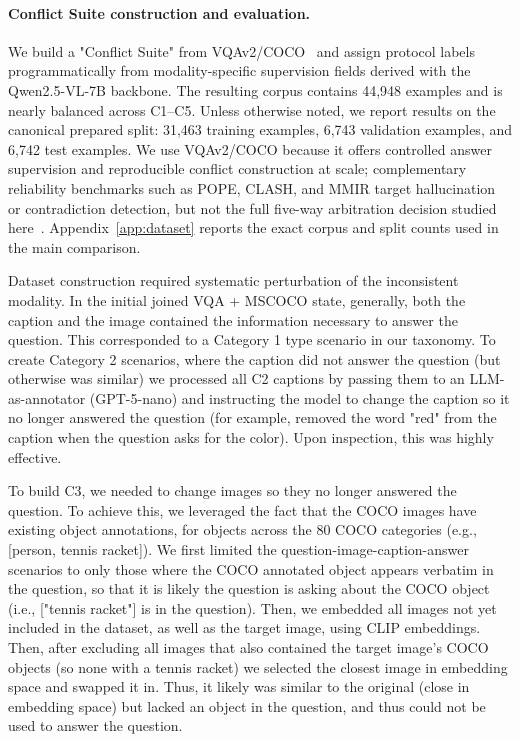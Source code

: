 \documentclass[11pt]{article}
\begin{document}


\paragraph{Conflict Suite construction and evaluation.}
We build a "Conflict Suite" from VQAv2/COCO~\citep{antol_vqa_2015,goyal_vqav2_2017}
and assign protocol labels programmatically from modality-specific supervision fields
derived with the Qwen2.5-VL-7B backbone. The resulting corpus contains 44,948 examples and
is nearly balanced across C1--C5. Unless otherwise noted, we report results on the
canonical prepared split: 31,463 training examples, 6,743 validation examples, and
6,742 test examples.
We use VQAv2/COCO because it offers controlled answer supervision and reproducible conflict
construction at scale; complementary reliability benchmarks such as POPE, CLASH, and MMIR
target hallucination or contradiction detection, but not the full five-way arbitration
decision studied here~\citep{liEvaluatingObjectHallucination2023,popordanoskaCLASHBenchmarkCrossModal2025,yanMultimodalInconsistencyReasoning2025}.
Appendix~\ref{app:dataset} reports the exact corpus and split counts used in the main
comparison.

Dataset construction required systematic perturbation of the inconsistent modality. In the initial joined VQA + MSCOCO state, generally, both the caption and the image contained the information necessary to answer the question. This corresponded to a Category 1 type scenario in our taxonomy. To create Category 2 scenarios, where the caption did not answer the question (but otherwise was similar) we processed all C2 captions by passing them to an LLM-as-annotator (GPT-5-nano) and instructing the model to change the caption so it no longer answered the question (for example, removed the word "red" from the caption when the question asks for the color). Upon inspection, this was highly effective. 

To build C3, we needed to change images so they no longer answered the question. To achieve this, we leveraged the fact that the COCO images have existing object annotations, for objects across the 80 COCO categories (e.g., [person, tennis racket]). We first limited the question-image-caption-answer scenarios to only those where the COCO annotated object appears verbatim in the question, so that it is likely the question is asking about the COCO object (i.e., ["tennis racket"] is in the question). Then, we embedded all images not yet included in the dataset, as well as the target image, using CLIP embeddings. Then, after excluding all images that also contained the target image's COCO objects (so none with a tennis racket) we selected the closest image in embedding space and swapped it in. Thus, it likely was similar to the original (close in embedding space) but lacked an object in the question, and thus could not be used to answer the question.
\end{document}
